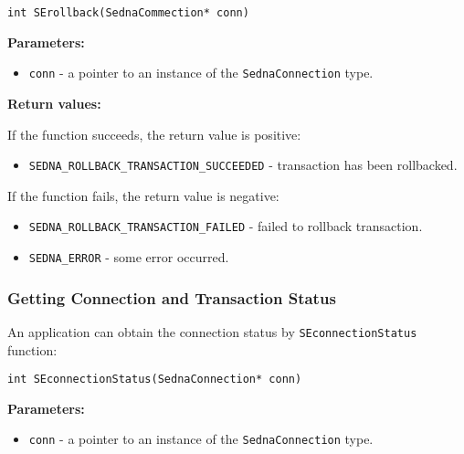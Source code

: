 \documentclass[a4paper,12pt]{article}
\newenvironment{citemize}
{\begin{itemize}
  \setlength{\itemsep}{0pt}
  \setlength{\parskip}{0pt}
  \setlength{\parsep}{0pt}}
{\end{itemize}}
\begin{document}
\begin{verbatim}
int SErollback(SednaCommection* conn)
\end{verbatim}

\noindent
\textbf{Parameters:}

\begin{citemize}
\item\verb!conn! - a pointer to an instance of the \verb!SednaConnection! type.
\end{citemize}

\noindent
\textbf{Return values:}

\medskip

\noindent
If the function succeeds, the return value is positive:

\begin{citemize}
\item\verb!SEDNA_ROLLBACK_TRANSACTION_SUCCEEDED! - transaction has been
rollbacked.
\end{citemize}

\noindent
If the function fails, the return value is negative:

\begin{citemize}
\item\verb!SEDNA_ROLLBACK_TRANSACTION_FAILED! - failed to rollback transaction.
\item\verb!SEDNA_ERROR! - some error occurred.
\end{citemize}


\subsubsection{Getting Connection and Transaction Status}

An application can obtain the connection status by \verb!SEconnectionStatus!
function:

\begin{verbatim}
int SEconnectionStatus(SednaConnection* conn)
\end{verbatim}

\noindent
\textbf{Parameters:}

\begin{citemize}
\item\verb!conn! - a pointer to an instance of the \verb!SednaConnection! type.
\end{citemize}
\end{document}
